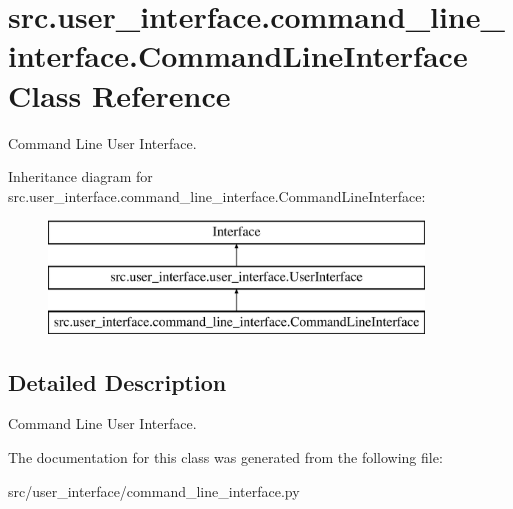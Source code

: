 \hypertarget{classsrc_1_1user__interface_1_1command__line__interface_1_1_command_line_interface}{}\section{src.\+user\+\_\+interface.\+command\+\_\+line\+\_\+interface.\+Command\+Line\+Interface Class Reference}
\label{classsrc_1_1user__interface_1_1command__line__interface_1_1_command_line_interface}


Command Line User Interface.  


Inheritance diagram for src.\+user\+\_\+interface.\+command\+\_\+line\+\_\+interface.\+Command\+Line\+Interface\+:\begin{figure}[H]
\begin{center}
\leavevmode
\includegraphics[height=3.000000cm]{classsrc_1_1user__interface_1_1command__line__interface_1_1_command_line_interface}
\end{center}
\end{figure}


\subsection{Detailed Description}
Command Line User Interface. 

The documentation for this class was generated from the following file\+:\begin{DoxyCompactItemize}
\item 
src/user\+\_\+interface/command\+\_\+line\+\_\+interface.\+py\end{DoxyCompactItemize}
